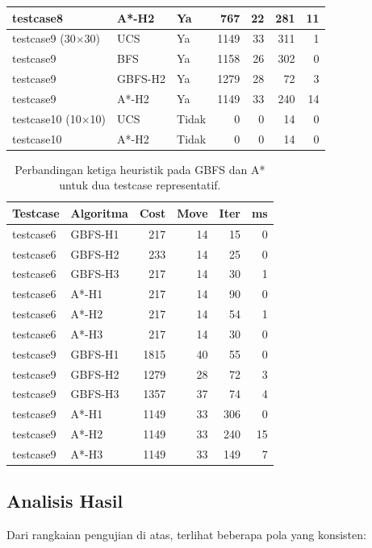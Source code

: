 \documentclass[11pt,a4paper]{article}
\begin{document}
\begin{longtable}{lllrrrr}
testcase8                 & A*-H2   & Ya    &  767 & 22 & 281 & 11 \\
\midrule
testcase9 (30$\times$30)  & UCS     & Ya    & 1149 & 33 & 311 & 1 \\
testcase9                 & BFS     & Ya    & 1158 & 26 & 302 & 0 \\
testcase9                 & GBFS-H2 & Ya    & 1279 & 28 &  72 & 3 \\
testcase9                 & A*-H2   & Ya    & 1149 & 33 & 240 & 14 \\
\midrule
testcase10 (10$\times$10) & UCS     & Tidak &    0 &  0 &  14 & 0 \\
testcase10                & A*-H2   & Tidak &    0 &  0 &  14 & 0 \\
\bottomrule
\end{longtable}

\begin{table}[H]
\centering
\begin{tabular}{llrrrr}
\toprule
\textbf{Testcase} & \textbf{Algoritma} & \textbf{Cost} & \textbf{Move} & \textbf{Iter} & \textbf{ms} \\
\midrule
testcase6 & GBFS-H1 & 217  & 14 &  15 & 0 \\
testcase6 & GBFS-H2 & 233  & 14 &  25 & 0 \\
testcase6 & GBFS-H3 & 217  & 14 &  30 & 1 \\
testcase6 & A*-H1   & 217  & 14 &  90 & 0 \\
testcase6 & A*-H2   & 217  & 14 &  54 & 1 \\
testcase6 & A*-H3   & 217  & 14 &  30 & 0 \\
\midrule
testcase9 & GBFS-H1 & 1815 & 40 &  55 & 0 \\
testcase9 & GBFS-H2 & 1279 & 28 &  72 & 3 \\
testcase9 & GBFS-H3 & 1357 & 37 &  74 & 4 \\
testcase9 & A*-H1   & 1149 & 33 & 306 & 0 \\
testcase9 & A*-H2   & 1149 & 33 & 240 & 15 \\
testcase9 & A*-H3   & 1149 & 33 & 149 & 7 \\
\bottomrule
\end{tabular}
\caption{Perbandingan ketiga heuristik pada GBFS dan A* untuk dua testcase representatif.}
\end{table}

\subsection{Analisis Hasil}
Dari rangkaian pengujian di atas, terlihat beberapa pola yang konsisten:
\end{document}
